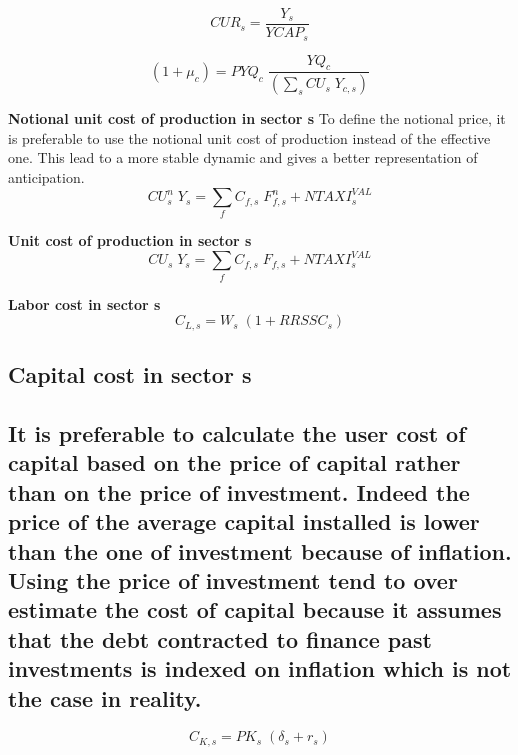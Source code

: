 \documentclass[12pt]{article}
\numberwithin{equation}{section}
\begin{document}
\begin{dmath}
CUR_{s} = \frac{Y_{s}}{YCAP_{s}}
\end{dmath}


\begin{dmath}
\left( 1 + \mu_{c} \right) = PYQ_{c} \; \frac{YQ_{c}}{\left( \sum_{s} CU_{s} \; Y_{c, s} \right)}
\end{dmath}

\textbf{Notional unit cost of production in sector s}
To define the notional price, it is preferable to use the notional unit cost of production instead of the effective one. This lead to a more stable dynamic and gives a better representation of anticipation.
\begin{dmath}
CU^{n}_{s} \; Y_{s} = \sum_{f} C_{f, s} \; F^{n}_{f, s} + NTAXI^{VAL}_{s}
\end{dmath}

\textbf{Unit cost of production in sector s}
\begin{dmath}
CU_{s} \; Y_{s} = \sum_{f} C_{f, s} \; F_{f, s} + NTAXI^{VAL}_{s}
\end{dmath}

\textbf{Labor cost in sector s}
\begin{dmath}
C_{L, s} = W_{s} \; \left( 1 + RRSSC_{s} \right)
\end{dmath}



\subsection{Capital cost in sector s}




\subsection{It is preferable to calculate the user cost of capital based on the price of capital rather than on the price of investment. Indeed the price of the average capital installed is lower than the one of investment because of inflation. Using the price of investment tend to over estimate the cost of capital because it assumes that the debt contracted to finance past investments is indexed on inflation which is not the case in reality.}


\begin{dmath}
C_{K, s} = PK_{s} \; \left( \delta_{s} + r_{s} \right)
\end{dmath}
\end{document}
